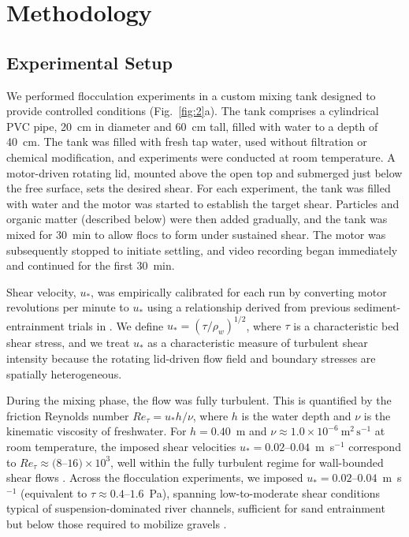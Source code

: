\documentclass{agujournal2019}
\begin{document}
\section{Methodology}

\subsection{Experimental Setup}

We performed flocculation experiments in a custom mixing tank designed to provide controlled conditions (Fig.~\ref{fig:2}a). The tank comprises a cylindrical PVC pipe, 20~cm in diameter and 60~cm tall, filled with water to a depth of 40~cm. The tank was filled with fresh tap water, used without filtration or chemical modification, and experiments were conducted at room temperature. A motor-driven rotating lid, mounted above the open top and submerged just below the free surface, sets the desired shear. For each experiment, the tank was filled with water and the motor was started to establish the target shear. Particles and organic matter (described below) were then added gradually, and the tank was mixed for 30~min to allow flocs to form under sustained shear. The motor was subsequently stopped to initiate settling, and video recording began immediately and continued for the first 30~min.

Shear velocity, $u_*$, was empirically calibrated for each run by converting motor revolutions per minute to $u_*$ using a relationship derived from previous sediment-entrainment trials in . We define $u_* = (\tau/\rho_w)^{1/2}$, where $\tau$ is a characteristic bed shear stress, and we treat $u_*$ as a characteristic measure of turbulent shear intensity because the rotating lid-driven flow field and boundary stresses are spatially heterogeneous.

During the mixing phase, the flow was fully turbulent. This is quantified by the friction Reynolds number $Re_{\tau} = u_* h / \nu$, where $h$ is the water depth and $\nu$ is the kinematic viscosity of freshwater. For $h = 0.40$~m and $\nu \approx 1.0 \times 10^{-6}\ \mathrm{m^2\,s^{-1}}$ at room temperature, the imposed shear velocities $u_* = 0.02$–$0.04$~m~s$^{-1}$ correspond to $Re_{\tau} \approx (8$–$16)\times10^{3}$, well within the fully turbulent regime for wall-bounded shear flows \cite{Pope2000, Schlichting2000}. Across the flocculation experiments, we imposed $u_* = 0.02$–$0.04$~m~s$^{-1}$ (equivalent to $\tau \approx 0.4$–$1.6$~Pa), spanning low-to-moderate shear conditions typical of suspension-dominated river channels, sufficient for sand entrainment but below those required to mobilize gravels \cite{julien2018river}.
\end{document}
